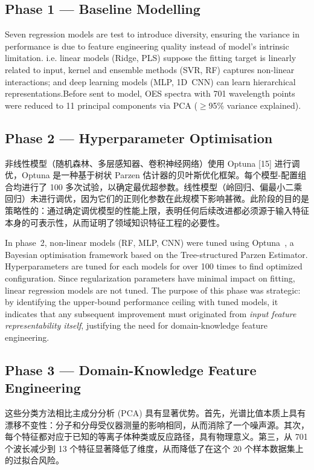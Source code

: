 \subsection{Phase 1 --- Baseline Modelling}

Seven regression models are test to introduce diversity, ensuring the variance in performance is due to feature engineering quality instead of model's intrinsic limitation. i.e. linear models (Ridge, PLS) suppose the fitting target is linearly related to input, kernel and ensemble methods (SVR, RF) captures non-linear interactions; and deep learning models (MLP, 1D~CNN) can learn hierarchical representations.Before sent to model, OES spectra with 701 wavelength points were reduced to 11 principal components via PCA ($\geq$95\% variance explained).



\subsection{Phase 2 --- Hyperparameter Optimisation}

非线性模型（随机森林、多层感知器、卷积神经网络）使用 Optuna [15] 进行调优，Optuna 是一种基于树状 Parzen 估计器的贝叶斯优化框架。每个模型-配置组合均进行了 100 多次试验，以确定最优超参数。线性模型（岭回归、偏最小二乘回归）未进行调优，因​​为它们的正则化参数在此规模下影响甚微。此阶段的目的是策略性的：通过确定调优模型的性能上限，表明任何后续改进都必须源于输入特征本身的可表示性，从而证明了领域知识特征工程的必要性。

In phase~2, non-linear models (RF, MLP, CNN) were tuned using Optuna~\cite{optuna2019}, a Bayesian optimisation framework based on the Tree-structured Parzen Estimator. Hyperparameters are tuned for each models for over 100 times to find optimized configuration. Since regularization parameters have minimal impact on fitting, linear regression models are not tuned. The purpose of this phase was strategic: by identifying the upper-bound performance ceiling with tuned models, it indicates that any subsequent improvement must originated from \emph{input feature representability itself}, justifying the need for domain-knowledge feature engineering.




\subsection{Phase 3 --- Domain-Knowledge Feature Engineering}

这些分类方法相比主成分分析 (PCA) 具有显著优势。首先，光谱比值本质上具有漂移不变性：分子和分母受仪器测量的影响相同，从而消除了一个噪声源。其次，每个特征都对应于已知的等离子体种类或反应路径，具有物理意义。第三，从 701 个波长减少到 13 个特征显著降低了维度，从而降低了在这个 20 个样本数据集上的过拟合风险。

